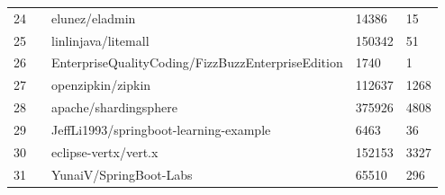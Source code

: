 \begin{table*}
\begin{tabular}{|l|l|l|l|l|}
		24          &                            & elunez/eladmin                                    & 14386                   & 15                      \\  \cline{1-1} \cline{3-5}
		25          &                            & linlinjava/litemall                               & 150342                  & 51                      \\  \cline{1-1} \cline{3-5}
		26          &                            & EnterpriseQualityCoding/FizzBuzzEnterpriseEdition & 1740                    & 1                       \\  \cline{1-1} \cline{3-5}
		27          &                            & openzipkin/zipkin                                 & 112637                  & 1268                    \\  \cline{1-1} \cline{3-5}
		28          &                            & apache/shardingsphere                             & 375926                  & 4808                    \\  \cline{1-1} \cline{3-5}
		29          &                            & JeffLi1993/springboot-learning-example            & 6463                    & 36                      \\  \cline{1-1} \cline{3-5}
		30          &                            & eclipse-vertx/vert.x                              & 152153                  & 3327                    \\  \cline{1-1} \cline{3-5}
		31          &                            & YunaiV/SpringBoot-Labs                            & 65510                   & 296                     \\ \hline
	\end{tabular}
\end{table*}


